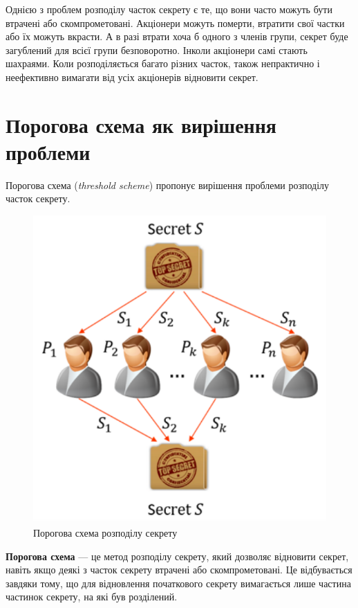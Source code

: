 Однією з проблем розподілу часток секрету є те, що вони часто можуть бути втрачені або скомпрометовані. Акціонери можуть померти, втратити свої частки або їх можуть вкрасти. А в разі втрати хоча б одного з членів групи, секрет буде загублений для всієї групи безповоротно. Інколи акціонери самі стають шахраями. Коли розподіляється багато різних часток, також непрактично і неефективно вимагати від усіх акціонерів відновити секрет.

\section{Порогова схема як вирішення проблеми}

Порогова схема (\textit{threshold scheme}) пропонує вирішення проблеми розподілу часток секрету.

\vspace{-0.5cm}
\begin{figure}[ht]
        \centering
        \includegraphics[scale=0.4]{IMAGES/thresholdSSS.png}
        \caption{Порогова схема розподілу секрету}
        \label{fig_thresholdSSscheme}
\end{figure}

\textbf{Порогова схема} --- це метод розподілу секрету, який дозволяє відновити секрет, навіть якщо деякі з часток секрету втрачені або скомпрометовані. Це відбувається завдяки тому, що для відновлення початкового секрету вимагається лише частина частинок секрету, на які був розділений.


